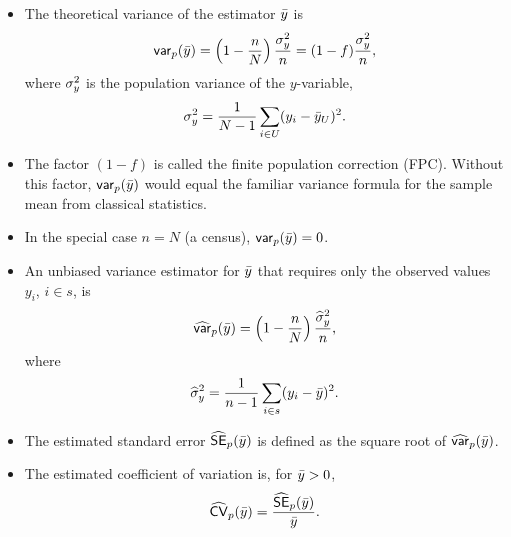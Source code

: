 \documentclass{my_eth_beamer}
\numberwithin{equation}{section}
\begin{document}
\begin{frame}
    \begin{itemize}
    \setlength{\itemsep}{8pt}
        \item The \alert{theoretical variance} of the estimator $\bar{y}$ is
            \begin{equation*}
                \mathsf{var}_p(\bar{y}) = \left(1 - \frac{n}{N}\right)\frac{{\sigma_y^2}}{n} =
                    (1 - f)\frac{{\sigma_y^2}}{n},
            \end{equation*}
            \noindent where ${\sigma_y^2}$ is the population variance of the
            $y$-variable,
            \begin{equation*}
                {\ensuremath{\sigma_y^2}} = \frac{1}{N - 1}\sum_{i \in U} (y_i - \bar{y}_U)^2.
            \end{equation*}
        \item The factor $(1 - f)$ is called the \alert{finite population
            correction} (FPC). Without this factor, $\mathsf{var}_p(\bar{y})$ would equal
            the familiar variance formula for the sample mean from classical
            statistics.
        \item In the \alert{special case} $n = N$ (a census),
            $\mathsf{var}_p(\bar{y}) = 0$.
    \end{itemize}
\end{frame}

\begin{frame}
    \begin{itemize}
    \setlength{\itemsep}{14pt}
        \item An unbiased \alert{variance estimator} for $\bar{y}$ that requires
            only the observed values $y_i$, $i \in s$, is
            \begin{equation*}
                \widehat{\mathsf{var}}_p(\bar{y}) = \left(1 - \frac{n}{N}\right)
                    \frac{\widehat{\sigma}_y^2}{n},
            \end{equation*}
            \noindent where
            \begin{equation*}
                \widehat{\sigma}_y^2 = \frac{1}{n - 1}\sum_{i \in s}(y_i - \bar{y})^2.
            \end{equation*}
        \item The estimated \alert{standard error} $\widehat{\mathsf{SE}}_p(\bar{y})$ is
            defined as the square root of $\widehat{\mathsf{var}}_p(\bar{y})$.
        \item The estimated \alert{coefficient of variation} is, for
            $\bar{y} > 0$,
            \begin{equation*}
                \widehat{\mathsf{CV}}_p(\bar{y}) = \frac{\widehat{\mathsf{SE}}_p(\bar{y})}{\bar{y}}.
            \end{equation*}
    \end{itemize}
\end{frame}
\end{document}
